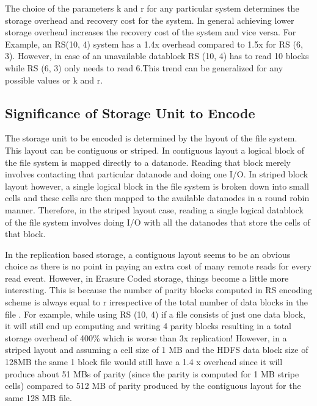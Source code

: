 \documentclass{sig-alternate-05-2015}
\begin{document}
The choice of the parameters k and r for any particular system determines the storage overhead and recovery cost for the system. In general achieving lower storage overhead increases the recovery cost of the system and vice versa. For Example, an RS(10, 4) system has a 1.4x overhead compared to 1.5x for RS (6, 3). However, in case of an unavailable datablock RS (10, 4) has to read 10 blocks while RS (6, 3) only needs to read 6.This trend can be generalized for any possible values or k and r. 



\subsection{Significance of Storage Unit to Encode}

The storage unit to be encoded is determined by the layout of the file system. This layout can be contiguous or striped. In contiguous layout a logical block of the file system is mapped directly to a datanode. Reading that block merely involves contacting that particular datanode and doing one I/O.  In striped block layout however, a single logical block in the file system is broken down into small cells and these cells are then mapped to the available datanodes in a round robin manner. Therefore, in the striped layout case, reading a single logical datablock of the file system involves doing I/O with all the datanodes that store the cells of that block. 


In the replication based storage, a contiguous layout seems to be an obvious choice as there is no point in paying an extra cost of many remote reads for every read event. However, in Erasure Coded storage, things become a little more interesting. This is because the number of parity blocks computed in RS encoding scheme is always equal to r irrespective of the total number of data blocks in the file \cite{blog}. For example, while using RS (10, 4) if a file consists of just one data block, it will still end up computing and writing 4 parity blocks resulting in a total storage overhead of 400\% which is worse than 3x replication! However, in a striped layout and assuming a cell size of 1 MB and the HDFS data block size of 128MB the same 1 block file would still have a 1.4 x overhead since it will produce about 51 MBs of parity (since the parity is computed for 1 MB stripe cells) compared to 512 MB of parity produced by the contiguous layout for the same 128 MB file. 
\end{document}
